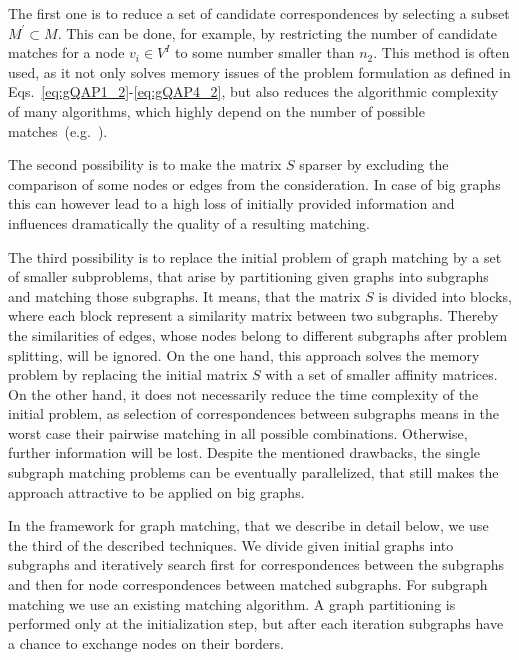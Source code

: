 The first one is to reduce a set of candidate correspondences by selecting a subset $M^\prime\subset M$. This can be done, for example, by restricting the number of candidate matches for a node $v_i\in V^I$ to some number smaller than $n_2$. This method is often used, as it not only solves memory issues of the problem formulation as defined in Eqs.~\eqref{eq:gQAP1_2}-\eqref{eq:gQAP4_2}, but also reduces the algorithmic complexity of many algorithms, which highly depend on the number of possible matches~(e.g.~\cite{Cho2010_RRWM,Cho2012_ProgressiveGM,Cho2014_Haystack,Leordeanu2005_SM}).

The second possibility is to make the matrix $S$ sparser by excluding the comparison of some nodes or edges from the consideration. In case of big graphs this can however lead to a high loss of initially provided information and influences dramatically the quality of a resulting matching. 

The third possibility is to replace the initial problem of graph matching by a set of smaller subproblems, that arise by partitioning given graphs into subgraphs and matching those subgraphs. It means, that the matrix $S$ is divided into blocks, where each block represent a similarity matrix between two subgraphs. Thereby the similarities of edges, whose nodes belong to different subgraphs after problem splitting, will be ignored. On the one hand, this approach solves the memory problem by replacing the initial matrix $S$ with a set of smaller affinity matrices. On the other hand, it does not necessarily reduce the time complexity of the initial problem, as selection of correspondences between subgraphs means in the worst case their pairwise matching in all possible combinations. Otherwise, further information will be lost. Despite the mentioned drawbacks, the single subgraph matching problems can be eventually parallelized, that still makes the approach attractive to be applied on big graphs.

In the framework for graph matching, that we describe in detail below, we use the third of the described techniques. We divide given initial graphs into subgraphs and iteratively search first for correspondences between the subgraphs and then for node correspondences between matched subgraphs. For subgraph matching we use an existing matching algorithm. A graph partitioning is performed only at the initialization step, but after each iteration subgraphs have a chance to exchange nodes on their borders.

